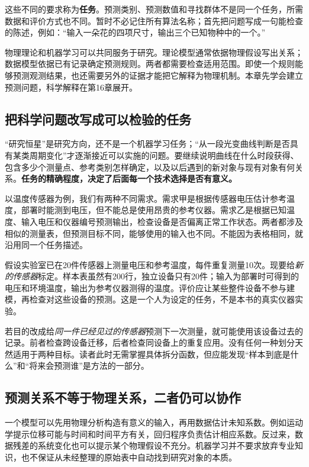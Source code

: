 这些不同的要求称为\textbf{任务}。预测类别、预测数值和寻找群体不是同一个任务，所需数据和评价方式也不同。暂时不必记住所有算法名称；首先把问题写成一句能检查的陈述，例如：“输入一朵花的四项尺寸，输出三个已知物种中的一个。”

物理理论和机器学习可以共同服务于研究。理论模型通常依据物理假设写出关系；数据模型依据已有记录确定预测规则。两者都需要检查适用范围。即使一个规则能够预测观测结果，也还需要另外的证据才能把它解释为物理机制。本章先学会建立预测问题，科学解释在第16章展开。

\subsection{把科学问题改写成可以检验的任务}
“研究恒星”是研究方向，还不是一个机器学习任务；“从一段光变曲线判断是否具有某类周期变化”才逐渐接近可以实施的问题。要继续说明曲线在什么时段获得、包含多少个测量点、参考类别怎样确定，以及以后遇到的新对象与现有对象有何关系。\textbf{任务的精确程度，决定了后面每一个技术选择是否有意义。}

以温度传感器为例，我们有两种不同需求。需求甲是根据传感器电压估计参考温度，部署时能测到电压，但不能总是使用昂贵的参考仪器。需求乙是根据已知温度、输入电压和仪器编号预测输出，检查设备是否偏离正常工作状态。两者都涉及相似的测量表，但预测目标不同，能够使用的输入也不同。不能因为表格相同，就沿用同一个任务描述。

假设实验室已在20件传感器上测量电压和参考温度，每件重复测量10次。现要给\emph{新的传感器}标定。样本表虽然有200行，独立设备只有20件；输入为部署时可得到的电压和环境温度，输出为参考仪器测得的温度。评价应让某些整件设备不参与建模，再检查对这些设备的预测。这是一个人为设定的任务，不是本书的真实仪器实验。

若目的改成给\emph{同一件已经见过的传感器}预测下一次测量，就可能使用该设备过去的记录。前者检查跨设备迁移，后者检查同设备上的重复应用。没有任何一种划分天然适用于两种目标。读者此时无需掌握具体拆分函数，但应能发现“样本到底是什么”和“将来会预测谁”是方法的一部分。

\subsection{预测关系不等于物理关系，二者仍可以协作}
一个模型可以先用物理分析构造有意义的输入，再用数据估计未知系数。例如运动学提示位移可能与时间和时间平方有关，回归程序负责估计相应系数。反过来，数据残差的系统变化也可以提示某个物理假设不充分。机器学习并不要求放弃专业知识，也不保证从未经整理的原始表中自动找到研究对象的本质。

